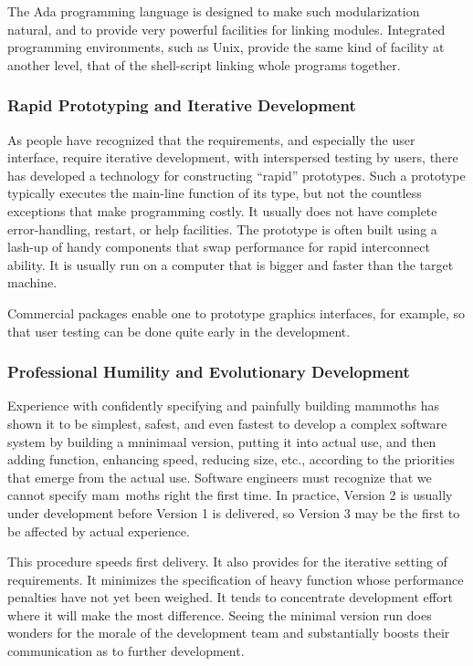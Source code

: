 \documentclass[11pt,final]{article}
\begin{document}
The Ada programming language is designed to make such modularization natural,
and to provide very powerful facilities for linking modules. Integrated
programming environments, such as Unix, provide the same kind of facility at
another level, that of the shell-script linking whole programs together.

\subsubsection*{Rapid Prototyping and Iterative Development}

As people have recognized that the requirements, and especially the user
interface, require iterative development, with interspersed testing by users,
there has developed a technology for constructing “rapid” prototypes. Such a
prototype typically executes the main-line function of its type, but not the
countless exceptions that make programming costly. It usually does not have
complete error-handling, restart, or help facilities. The prototype is often
built using a lash-up of handy components that swap performance for rapid
interconnect ability. It is usually run on a computer that is bigger and faster
than the target machine.

Commercial packages enable one to prototype graphics interfaces, for example,
so that user testing can be done quite early in the development.

\subsubsection*{Professional Humility and Evolutionary Development}

Experience with confidently specifying and painfully building mammoths has
shown it to be simplest, safest, and even fastest to develop a complex software
system by building a mninimaal version, putting it into actual use, and then
adding function, enhancing speed, reducing size, etc., according to the
priorities that emerge from the actual use. Software engineers must recognize
that we cannot specify mam~moths right the first time. In practice, Version 2
is usually under development before Version 1 is delivered, so Version 3 may be
the first to be affected by actual experience.

This procedure speeds first delivery. It also provides for the iterative
setting of requirements. It minimizes the specification of heavy function whose
performance penalties have not yet been weighed. It tends to concentrate
development effort where it will make the most difference. Seeing the minimal
version run does wonders for the morale of the development team and
substantially boosts their communication as to further development.
\end{document}
